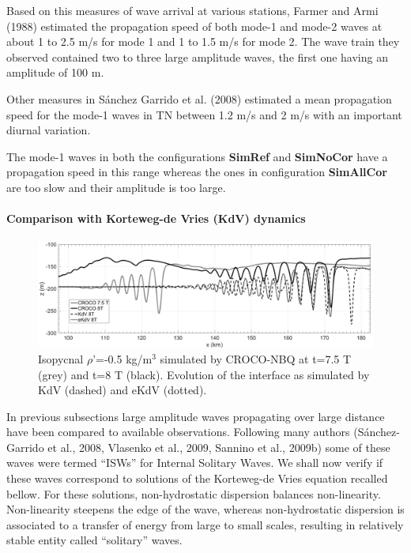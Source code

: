 Based on this measures of wave arrival at various stations, Farmer and Armi (1988) estimated the propagation speed of both mode-1 and mode-2 waves at about 1 to 2.5 m/s for mode 1 and 1 to 1.5 m/s for mode 2. The wave train they observed contained two to three large amplitude waves, the first one having an amplitude of 100 m. 

Other measures in S\'anchez Garrido et al. (2008) estimated a mean propagation speed for the mode-1 waves in TN between 1.2 m/s and 2 m/s with an important diurnal variation.

The mode-1 waves in both the configurations \textbf{SimRef} and \textbf{SimNoCor} have a propagation speed in this range whereas the ones in configuration \textbf{SimAllCor} are too slow and their amplitude is too large.



\paragraph{Comparison with Korteweg-de Vries (KdV) dynamics}

\begin{figure}[!h]
\centering
\includegraphics[width=1\linewidth]{./papier2D/exp_kdv_75-8T.png}
\caption{Isopycnal $\rho$'=-0.5 kg/m$^3$ simulated by CROCO-NBQ at t=7.5 T (grey) and t=8 T (black). Evolution of the interface as simulated by KdV (dashed) and eKdV (dotted).}
\label{fig_kdv}
\end{figure}

In previous subsections large amplitude waves propagating over large distance have been compared to available observations. Following many authors (S\'anchez-Garrido et al., 2008, Vlasenko et al., 2009, Sannino et al., 2009b) some of these waves were termed ``ISWs'' for Internal Solitary Waves. We shall now verify if these waves correspond to solutions of the Korteweg-de Vries equation recalled bellow. For these solutions, non-hydrostatic dispersion balances non-linearity. Non-linearity steepens the edge of the wave, whereas non-hydrostatic dispersion is associated to a transfer of energy from large to  small scales, resulting in relatively stable entity called ``solitary'' waves. 

